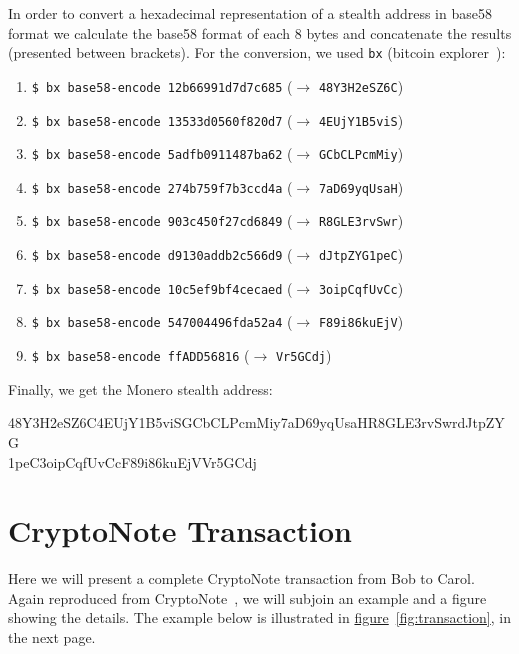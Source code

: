 In order to convert a hexadecimal representation of a stealth address in base58 format we calculate the base58 format of each 8 bytes and concatenate the results (presented between brackets). For the conversion, we used \verb|bx| (bitcoin explorer~\cite{bx}):

\begin{enumerate}
  \item \verb|$ bx base58-encode 12b66991d7d7c685| ($\rightarrow$ \verb|48Y3H2eSZ6C|)
  \item \verb|$ bx base58-encode 13533d0560f820d7| ($\rightarrow$ \verb|4EUjY1B5viS|)
  \item \verb|$ bx base58-encode 5adfb0911487ba62| ($\rightarrow$ \verb|GCbCLPcmMiy|)
  \item \verb|$ bx base58-encode 274b759f7b3ccd4a| ($\rightarrow$ \verb|7aD69yqUsaH|)
  \item \verb|$ bx base58-encode 903c450f27cd6849| ($\rightarrow$ \verb|R8GLE3rvSwr|)
  \item \verb|$ bx base58-encode d9130addb2c566d9| ($\rightarrow$ \verb|dJtpZYG1peC|)
  \item \verb|$ bx base58-encode 10c5ef9bf4cecaed| ($\rightarrow$ \verb|3oipCqfUvCc|)
  \item \verb|$ bx base58-encode 547004496fda52a4| ($\rightarrow$ \verb|F89i86kuEjV|)
  \item \verb|$ bx base58-encode ffADD56816| ($\rightarrow$ \verb|Vr5GCdj|)
\end{enumerate}

Finally, we get the Monero stealth address:
\vspace{0.3cm}
\begin{tcolorbox}[colback=green!5!white,colframe=green!65!black]
  \small{48Y3H2eSZ6C4EUjY1B5viSGCbCLPcmMiy7aD69yqUsaHR8GLE3rvSwrdJtpZYG\\
  1peC3oipCqfUvCcF89i86kuEjVVr5GCdj}
\end{tcolorbox}
\clearpage
\pagebreak

\section{CryptoNote Transaction} \label{sec:cryptonote_transaction}
%
Here we will present a complete CryptoNote transaction from Bob to Carol. Again reproduced from CryptoNote~\cite{cryptonote}, we will subjoin an example and a figure showing the details. The example below is illustrated in \hyperref[fig:transaction]{figure}~\ref{fig:transaction}, in the next page.

